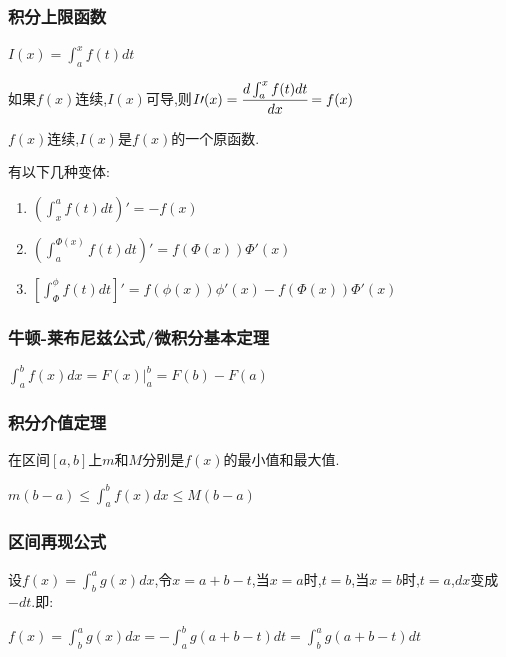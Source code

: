 \documentclass[UTF8,12pt]{ctexbook}
\newcommand{\defFunction}[1]{f(#1)}
\newcommand{\definiteIntegral}[2]{\int^{#1}_{#2}}
\begin{document}
{{{\subsubsection{积分上限函数}{
  $I(x) = \definiteIntegral{x}{a}\defFunction{t}dt$

  如果$\defFunction{x}连续$,$I(x)$可导,则$I\prime(x) = \cfrac{d\definiteIntegral{x}{a}f(t)dt}{dx} = f(x)$

  $\defFunction{x}$连续,$I(x)$是$f(x)$的一个原函数.

  有以下几种变体:

  \begin{enumerate}
    \item $(\definiteIntegral{a}{x}\defFunction{t}dt)\prime = -\defFunction{x}$
    \item $(\definiteIntegral{\Phi(x)}{a}\defFunction{t}dt)\prime = \defFunction{\Phi(x)}\Phi\prime(x)$
    \item $[\definiteIntegral{\phi}{\Phi}\defFunction{t}dt]\prime = \defFunction{\phi(x)}\phi\prime(x) - \defFunction{\Phi(x)}\Phi\prime(x)$
  \end{enumerate}

}%

\subsubsection{牛顿-莱布尼兹公式/微积分基本定理}{
  $\definiteIntegral{b}{a}\defFunction{x}dx = F(x)|^b_a = F(b) - F(a)$
}%

\subsubsection{积分介值定理}{

  在区间$[a,b]$上$m$和$M$分别是$\defFunction{x}$的最小值和最大值.

  $m(b - a) \leq \definiteIntegral{b}{a}\defFunction{x}dx \leq M(b - a)$

}%

\subsubsection{区间再现公式}{
  设$\defFunction{x} = \definiteIntegral{a}{b}g(x)dx$,令$x = a + b - t$,当$x = a$时,$t = b$,当$x = b$时,$t = a$,$dx$变成$-dt$.即:

  $\defFunction{x} = \definiteIntegral{a}{b}g(x)dx = -\definiteIntegral{b}{a}g(a+b-t)dt = \definiteIntegral{a}{b}g(a + b - t)dt$

}}}}
\end{document}

